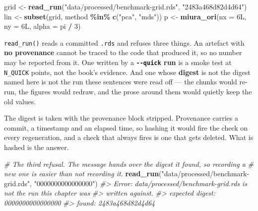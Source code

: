 \documentclass[
  british,
  a4paper,
]{book}
\newenvironment{Shaded}{\begin{snugshade}}{\end{snugshade}}
\newcommand{\AttributeTok}[1]{\textcolor[rgb]{0.13,0.29,0.53}{#1}}
\newcommand{\CommentTok}[1]{\textcolor[rgb]{0.56,0.35,0.01}{\textit{#1}}}
\newcommand{\DataTypeTok}[1]{\textcolor[rgb]{0.13,0.29,0.53}{#1}}
\newcommand{\DecValTok}[1]{\textcolor[rgb]{0.00,0.00,0.81}{#1}}
\newcommand{\FunctionTok}[1]{\textcolor[rgb]{0.13,0.29,0.53}{\textbf{#1}}}
\newcommand{\NormalTok}[1]{#1}
\newcommand{\OtherTok}[1]{\textcolor[rgb]{0.56,0.35,0.01}{#1}}
\newcommand{\SpecialCharTok}[1]{\textcolor[rgb]{0.81,0.36,0.00}{\textbf{#1}}}
\newcommand{\StringTok}[1]{\textcolor[rgb]{0.31,0.60,0.02}{#1}}
\begin{document}
\begin{Shaded}
\begin{Highlighting}[]
\NormalTok{grid }\OtherTok{\textless{}{-}} \FunctionTok{read\_run}\NormalTok{(}\StringTok{"data/processed/benchmark{-}grid.rds"}\NormalTok{, }\StringTok{"2483a468d82d4d64"}\NormalTok{)}
\NormalTok{lin  }\OtherTok{\textless{}{-}} \FunctionTok{subset}\NormalTok{(grid, method }\SpecialCharTok{\%in\%} \FunctionTok{c}\NormalTok{(}\StringTok{"pca"}\NormalTok{, }\StringTok{"mds"}\NormalTok{))}
\NormalTok{p    }\OtherTok{\textless{}{-}} \FunctionTok{miura\_ori}\NormalTok{(}\AttributeTok{nx =} \DecValTok{6}\DataTypeTok{L}\NormalTok{, }\AttributeTok{ny =} \DecValTok{6}\DataTypeTok{L}\NormalTok{, }\AttributeTok{alpha =}\NormalTok{ pi }\SpecialCharTok{/} \DecValTok{3}\NormalTok{)}
\end{Highlighting}
\end{Shaded}

\texttt{read\_run()} reads a committed \texttt{.rds} and refuses three things. An artefact with
\textbf{no provenance} cannot be traced to the code that produced it, so no number may
be reported from it. One written by a \textbf{\texttt{-\/-quick} run} is a smoke test at
\texttt{N\_QUICK} points, not the book's evidence. And one whose \textbf{digest} is not the
digest named here is not the run these sentences were read off --- the chunks would
re-run, the figures would redraw, and the prose around them would quietly keep
the old values.

The digest is taken with the provenance block stripped. Provenance carries a
commit, a timestamp and an elapsed time, so hashing it would fire the check on
every regeneration, and a check that always fires is one that gets deleted. What
is hashed is the answer.

\begin{Shaded}
\begin{Highlighting}[]
\CommentTok{\# The third refusal. The message hands over the digest it found, so recording a}
\CommentTok{\# new one is easier than not recording it.}
\FunctionTok{read\_run}\NormalTok{(}\StringTok{"data/processed/benchmark{-}grid.rds"}\NormalTok{, }\StringTok{"0000000000000000"}\NormalTok{)}
\CommentTok{\#\textgreater{} Error: data/processed/benchmark{-}grid.rds is not the run this chapter was}
\CommentTok{\#\textgreater{}   written against.}
\CommentTok{\#\textgreater{}   expected digest: 0000000000000000}
\CommentTok{\#\textgreater{}   found:           2483a468d82d4d64}
\end{Highlighting}
\end{Shaded}
\end{document}
